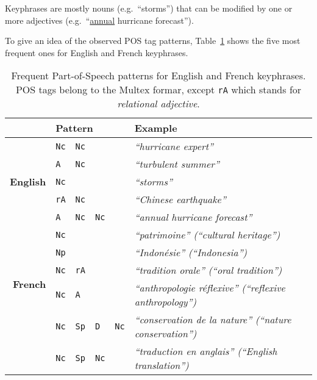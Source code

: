     \begin{property}\label{prop:noun_phrases}
      Keyphrases are mostly nouns (e.g.~``storms'') that can be modified by one
      or more adjectives (e.g.~``\underline{annual} hurricane forecast'').
    \end{property}

    To give an idea of the observed POS tag patterns,
    Table~\ref{tab:best_patterns} shows the five most frequent ones for English
    and French keyphrases.
    \begin{table}[b]
      \centering
      \begin{tabular}{r|lllll}
        \toprule
        \multicolumn{1}{r}{} & \multicolumn{4}{l}{\textbf{Pattern}} & \textbf{Example}\\
        \midrule
        \multirow{5}{*}[-2pt]{\begin{sideways}\textbf{English}\end{sideways}} & \verb:Nc: & \verb:Nc: & & & \textit{``hurricane expert''}\\ %
        & \verb:A: & \verb:Nc: & & & \textit{``turbulent summer''}\\ %
        & \verb:Nc: & & & & \textit{``storms''}\\ %
        & \verb:rA: & \verb:Nc: & & & \textit{``Chinese earthquake''}\\ %
        & \verb:A: & \verb:Nc: & \verb:Nc: & & \textit{``annual hurricane forecast''}\\ %
        \hline%
        \multirow{5}{*}[-2pt]{\begin{sideways}\textbf{French}\end{sideways}} & \verb:Nc: & & & & \textit{``patrimoine'' (``cultural heritage'')}\\ %
        & \verb:Np: & & & & \textit{``Indonésie'' (``Indonesia'')}\\ %
        & \verb:Nc: & \verb:rA: & & & \textit{``tradition orale'' (``oral tradition'')}\\ %
        & \verb:Nc: & \verb:A: & & & \textit{``anthropologie réflexive'' (``reflexive anthropology'')}\\ %
        & \verb:Nc: & \verb:Sp: & \verb:D: & \verb:Nc: & \textit{``conservation de la nature'' (``nature conservation'')}\\ %
        & \verb:Nc: & \verb:Sp: & \verb:Nc: & & \textit{``traduction en anglais'' (``English translation'')}\\ %
        \bottomrule
      \end{tabular}
      \caption{Frequent Part-of-Speech patterns for English and French
               keyphrases. POS tags belong to the Multex formar, except
               \texttt{rA} which stands for \textit{relational adjective}.
               \label{tab:best_patterns}}
    \end{table}

